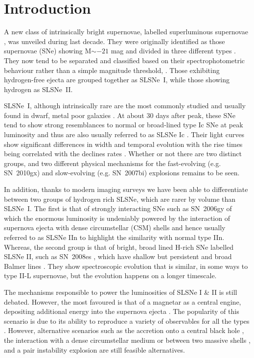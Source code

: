 \documentclass[useAMS,usenatbib]{mn2e}
\begin{document}
\section{Introduction}\label{sec:intro}
A new class of intrinsically bright supernovae, labelled superluminous supernovae \citep[SLSNe;][]{qu11,gy12}, was unveiled during last decade. They were originally identified as those supernovae (SNe) showing M$\sim-21$ mag \citep[e.g.][]{smi07,pa10,qu11,cho11,gy12,in13,how13} and divided in three different types \citep[see the early review of][]{gy12}. They now tend to be separated and classified based on their spectrophotometric behaviour rather than a simple magnitude threshold, 
 \citep[e.g.][]{pap15,in16b,pr16,lu16}. 
Those exhibiting hydrogen-free ejecta are grouped together as SLSNe~I, while those showing hydrogen as SLSNe~II. 

SLSNe~I, although intrinsically rare \citep{qu13,mc15,pr16} are the most commonly studied and usually found in dwarf, metal poor galaxies \citep[e.g.][]{lu14,le15,angus16,pe16,ch16}.  At about 30 days after peak, these SNe tend to show strong resemblances to normal or broad-lined type Ic SNe at peak luminosity \citep[e.g.][]{pa10,lm16} and thus are also usually referred to as SLSNe Ic \citep[e.g.][]{in13,ni13}. Their light curves show significant differences in width and temporal evolution
with the rise times being correlated with the declines rates \citep{ni15}. 
Whether or not there are two distinct groups, and two different physical mechanisms 
for the fast-evolving (e.g. SN~2010gx) and slow-evolving (e.g. SN~2007bi) 
explosions remains to be seen.

In addition, thanks to modern imaging surveys we have been able to differentiate between two groups of hydrogen rich SLSNe, which are  rarer by volume than SLSNe~I. The first is that of strongly interacting SNe such as SN~2006gy \citep{smi07,of07,ag09} of which the enormous luminosity is undeniably powered by the interaction of supernova ejecta with dense circumstellar (CSM) shells and hence usually referred to as SLSNe IIn to highlight the similarity with normal type IIn. Whereas, the second group is that of bright, broad lined H-rich SNe labelled SLSNe II, such as SN~2008es \citep{ge09,mi09}, which have shallow but persistent and broad Balmer lines \citep[see][for a review]{in16b}. They show spectroscopic evolution that is similar, in some ways to type II-L supernovae, but the evolution happens on a longer timescale. 

The mechanisms responsible to power the luminosities of SLSNe I \& II is still debated. However, the most favoured is that of a magnetar as a central engine, depositing additional energy into the supernova ejecta \citep{wo10,kb10,de12}. The popularity of this scenario is due to its ability to reproduce a variety of observables for all the types \citep[e.g.][]{in13,ni13,in16b}. However, alternative scenarios such as the accretion onto a central black hole \citep{dk13}, the interaction with a dense circumstellar medium \citep[e.g.][]{ci11} or between two massive shells \citep[pulsational pair instability,][]{woo07}, and a pair instability explosion \citep[e.g.][]{kb15} are still feasible alternatives.
\end{document}
